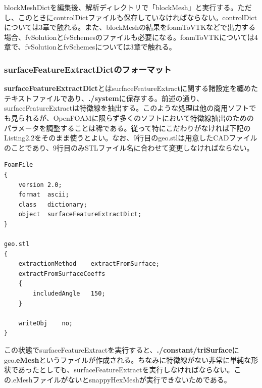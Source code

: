 \documentclass[dvipdfmx, 9pt, a4paper]{jsarticle}
\numberwithin{equation}{section}
\begin{document}
blockMeshDictを編集後、解析ディレクトリで「blockMesh」と実行する。ただし、このときにcontrolDictファイルも保存していなければならない。controlDictについては3章で触れる。また、blockMeshの結果をfoamToVTKなどで出力する場合、fvSolutionとfvSchemesのファイルも必要になる。foamToVTKについては4章で、fvSolutionとfvSchemesについては3章で触れる。

\subsubsection{surfaceFeatureExtractDictのフォーマット}
{\bf surfaceFeatureExtractDict}とはsurfaceFeatureExtractに関する諸設定を纏めたテキストファイルであり、{\bf ./system}に保存する。前述の通り、surfaceFeatureExtractは特徴線を抽出する。このような処理は他の商用ソフトでも見られるが、OpenFOAMに限らず多くのソフトにおいて特徴線抽出のためのパラメータを調整することは稀である。従って特にこだわりがなければ下記のListing2.2をそのまま使うとよい。なお、9行目のgeo.stlは用意したCADファイルのことであり、9行目のみSTLファイル名に合わせて変更しなければならない。
\begin{lstlisting}[caption=surfaceFeatureExtractDictの基本フォーマット]
FoamFile
{
	version	2.0;
	format	ascii;
	class	dictionary;
	object	surfaceFeatureExtractDict;
}

geo.stl
{
	extractionMethod	extractFromSurface;
	extractFromSurfaceCoeffs
	{
		includedAngle	150;
	}

	writeObj	no;
}
\end{lstlisting}\par
この状態でsurfaceFeatureExtractを実行すると、{\bf ./constant/triSurface}にgeo.{\bf eMesh}というファイルが作成される。ちなみに特徴線がない非常に単純な形状であったとしても、surfaceFeatureExtractを実行しなければならない。この.eMeshファイルがないとsnappyHexMeshが実行できないためである。
\end{document}
